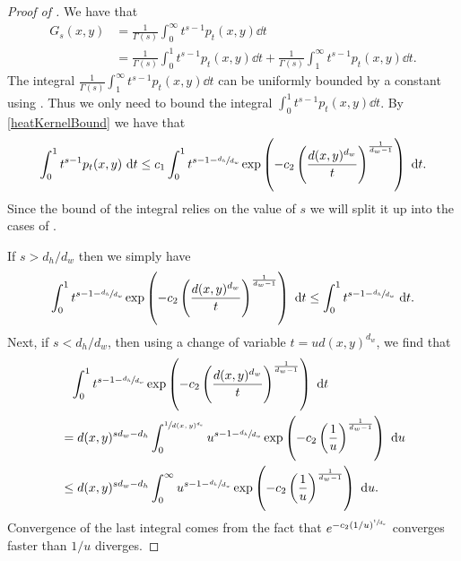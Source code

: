 \begin{proof}[Proof of ]
	We have that
	\begin{align}
		G_s(x,y) &= \frac{1}{\Gamma(s)}\int_{0}^{\infty} t^{s-1}p_t(x,y) \dd t \\
		&=\frac{1}{\Gamma(s)}\int_{0}^{1} t^{s-1}p_t(x,y) \dd t + \frac{1}{\Gamma(s)}\int_{1}^{\infty} t^{s-1}p_t(x,y) \dd t.
	\end{align}
	The integral $\frac{1}{\Gamma(s)}\int_{1}^{\infty} t^{s-1}p_t(x,y) \dd t$ can be uniformly bounded by a constant using . Thus we only need to bound the integral $\int_{0}^{1} t^{s-1}p_t(x,y) \dd t$. By \eqref{heatKernelBound} we have that
	\begin{equation}
		\int_{0}^{1} t^{s-1}p_t(x,y) \ \text{d} t \leq c_1 \int_{0}^{1} t^{s-1-\sfrac{d_h}{d_w}} \exp\left(-c_2 \left(\frac{d(x,y)^{d_w}}{t}\right)^{\frac{1}{d_w -1}}\right) \ \text{d} t.
	\end{equation}
	Since the bound of the integral relies on the value of $s$ we will split it up into the cases of .
	
	\medskip
	\noi If $s > d_h/d_w$ then we simply have 
	\begin{equation}
		\int_{0}^{1} t^{s-1-\sfrac{d_h}{d_w}} \exp\left(-c_2 \left(\frac{d(x,y)^{d_w}}{t}\right)^{\frac{1}{d_w -1}}\right) \ \text{d} t \leq \int_{0}^{1}t^{s-1-\sfrac{d_h}{d_w}} \ \text{d} t.
	\end{equation}
	Next, if $s < d_h/d_w$, then using a change of variable $t = u d(x,y)^{d_w}$, we find that
	\begin{align}
		&\phantom{=}\int_{0}^{1} t^{s-1-\sfrac{d_h}{d_w}} \exp\left(-c_2 \left(\frac{d(x,y)^{d_w}}{t}\right)^{\frac{1}{d_w -1}}\right) \ \text{d} t \\
		&=d(x,y)^{sd_w - d_h} \int_{0}^{\sfrac{1}{d(x,y)^{d_w}}} u^{s-1-\sfrac{d_h}{d_w}} \exp\left(-c_2 \left(\frac{1}{u}\right)^{\frac{1}{d_w -1}}\right) \ \text{d} u \\
		&\leq d(x,y)^{sd_w-d_h} \int_{0}^{\infty} u^{s-1-\sfrac{d_h}{d_w}} \exp\left(-c_2 \left(\frac{1}{u}\right)^{\frac{1}{d_w -1}}\right) \ \text{d} u.
	\end{align}
	Convergence of the last integral comes from the fact that $e^{-c_2(1/u)^{\sfrac{1}{d_w}}}$ converges faster than $1/u$ diverges.
	

\end{proof}
